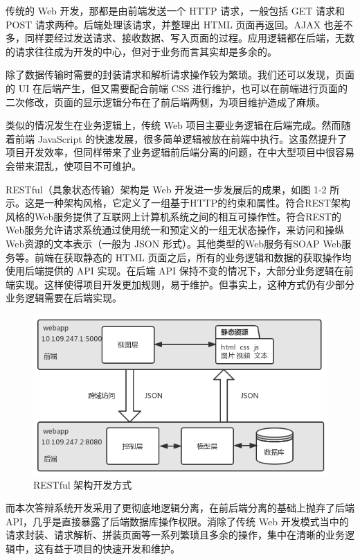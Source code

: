 传统的 Web 开发，那都是由前端发送一个 HTTP 请求，一般包括 GET 请求和 POST 请求两种。后端处理该请求，并整理出 HTML 页面再返回。AJAX 也差不多，同样要经过发送请求、接收数据、写入页面的过程。应用逻辑都在后端，无数的请求往往成为开发的中心，但对于业务而言其实却是多余的。

除了数据传输时需要的封装请求和解析请求操作较为繁琐。我们还可以发现，页面的 UI 在后端产生，但又需要配合前端 CSS 进行维护，也可以在前端进行页面的二次修改，页面的显示逻辑分布在了前后端两侧，为项目维护造成了麻烦。

类似的情况发生在业务逻辑上，传统 Web 项目主要业务逻辑在后端完成。然而随着前端 JavaScript 的快速发展，很多简单逻辑被放在前端中执行。这虽然提升了项目开发效率，但同样带来了业务逻辑前后端分离的问题，在中大型项目中很容易会带来混乱，使项目不可维护。

RESTful（具象状态传输）架构是 Web 开发进一步发展后的成果，如图 1-2 所示。这是一种架构风格，它定义了一组基于HTTP的约束和属性。符合REST架构风格的Web服务提供了互联网上计算机系统之间的相互可操作性。符合REST的Web服务允许请求系统通过使用统一和预定义的一组无状态操作，来访问和操纵Web资源的文本表示（一般为 JSON 形式）。其他类型的Web服务有SOAP Web服务等。前端在获取静态的 HTML 页面之后，所有的业务逻辑和数据的获取操作均使用后端提供的 API 实现。在后端 API 保持不变的情况下，大部分业务逻辑在前端实现。这样使得项目开发更加规则，易于维护。但事实上，这种方式仍有少部分业务逻辑需要在后端实现。

\begin{figure}
	\centering
	\includegraphics[width=0.7\linewidth]{figure/1-2}
	\caption{RESTful 架构开发方式}
\end{figure}

而本次答辩系统开发采用了更彻底地逻辑分离，在前后端分离的基础上抛弃了后端 API，几乎是直接暴露了后端数据库操作权限。消除了传统 Web 开发模式当中的请求封装、请求解析、拼装页面等一系列繁琐且多余的操作，集中在清晰的业务逻辑中，这有益于项目的快速开发和维护。


